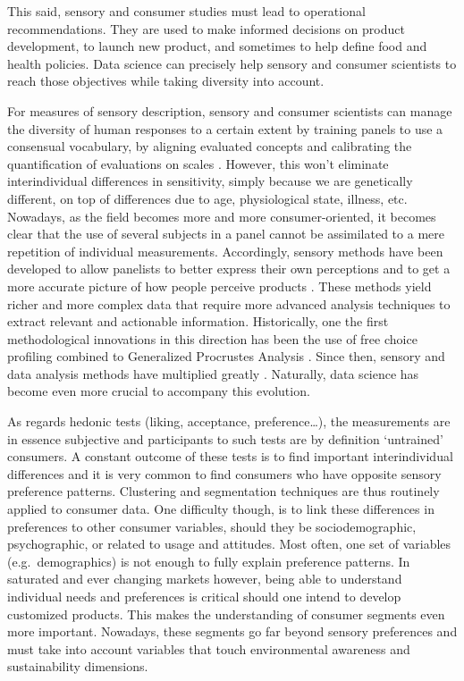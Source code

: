 \documentclass[
]{krantz}
\begin{document}
This said, sensory and consumer studies must lead to operational recommendations. They are used to make informed decisions on product development, to launch new product, and sometimes to help define food and health policies. Data science can precisely help sensory and consumer scientists to reach those objectives while taking diversity into account.

For measures of sensory description, sensory and consumer scientists can manage the diversity of human responses to a certain extent by training panels to use a consensual vocabulary, by aligning evaluated concepts and calibrating the quantification of evaluations on scales \citep{Bleibaum2020}. However, this won't eliminate interindividual differences in sensitivity, simply because we are genetically different, on top of differences due to age, physiological state, illness, etc. Nowadays, as the field becomes more and more consumer-oriented, it becomes clear that the use of several subjects in a panel cannot be assimilated to a mere repetition of individual measurements. Accordingly, sensory methods have been developed to allow panelists to better express their own perceptions and to get a more accurate picture of how people perceive products \citep{Varela2012}. These methods yield richer and more complex data that require more advanced analysis techniques to extract relevant and actionable information. Historically, one the first methodological innovations in this direction has been the use of free choice profiling combined to Generalized Procrustes Analysis \citep{Williams1984}. Since then, sensory and data analysis methods have multiplied greatly \citep{Delarue2022}. Naturally, data science has become even more crucial to accompany this evolution.

As regards hedonic tests (liking, acceptance, preference\ldots), the measurements are in essence subjective and participants to such tests are by definition `untrained' consumers. A constant outcome of these tests is to find important interindividual differences and it is very common to find consumers who have opposite sensory preference patterns. Clustering and segmentation techniques are thus routinely applied to consumer data. One difficulty though, is to link these differences in preferences to other consumer variables, should they be sociodemographic, psychographic, or related to usage and attitudes. Most often, one set of variables (e.g.~demographics) is not enough to fully explain preference patterns. In saturated and ever changing markets however, being able to understand individual needs and preferences is critical should one intend to develop customized products. This makes the understanding of consumer segments even more important. Nowadays, these segments go far beyond sensory preferences and must take into account variables that touch environmental awareness and sustainability dimensions.
\end{document}
